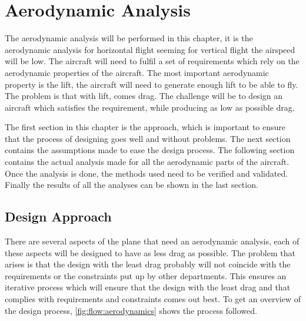 \chapter{Aerodynamic Analysis}
\setlength{\parindent}{15pt}
\label{ch:aero_anal}

The aerodynamic analysis will be performed in this chapter, it is the aerodynamic analysis for horizontal flight seeming for vertical flight the airspeed will be low. The aircraft will need to fulfil a set of requirements which rely on the aerodynamic properties of the aircraft. The most important aerodynamic property is the lift, the aircraft will need to generate enough lift to be able to fly. The problem is that with lift, comes drag. The challenge will be to design an aircraft which satisfies the requirement, while producing as low as possible drag.

The first section in this chapter is the approach, which is important to ensure that the process of designing goes well and without problems. The next section contains the assumptions made to ease the design process. The following section contains the actual analysis made for all the aerodynamic parts of the aircraft. Once the analysis is done, the methods used need to be verified and validated. Finally the results of all the analyses can be shown in the last section. 

\section{Design Approach}

There are several aspects of the plane that need an aerodynamic analysis, each of these aspects will be designed to have as less drag as possible. The problem that arises is that the design with the least drag probably will not coincide with the requirements or the constraints put up by other departments. This ensures an iterative process which will ensure that the design with the least drag and that complies with requirements and constraints comes out best. To get an overview of the design process, \autoref{fig:flow:aerodynamics} shows the process followed.

